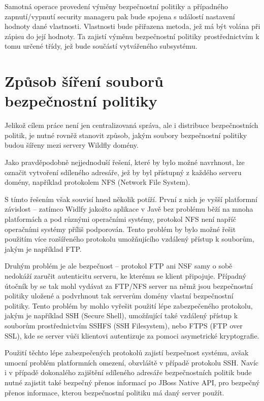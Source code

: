Samotná operace provedení výměny bezpečnostní politiky a případného zapnutí/vypnutí security manageru pak bude spojena s událostí nastavení hodnoty dané vlastnosti. Vlastnosti bude přiřazena metoda, jež má být volána při zápisu do její hodnoty. Ta zajistí výměnu bezpečnostní politiky prostřednictvím k tomu určené třídy, jež bude součástí vytvářeného subsystému.

\section{Způsob šíření souborů bezpečnostní politiky}

Jelikož cílem práce není jen centralizovaná správa, ale i distribuce bezpečnostních politik, je nutné rovněž stanovit způsob, jakým soubory bezpečnostní politiky budou šířeny mezi servery Wildfly domény.

Jako pravděpodobně nejjednoduší řešení, které by bylo možné navrhnout, lze označit vytvoření sdíleného adresáře, jež by byl přístupný z každého serveru domény, například protokolem NFS (Network File System).

S tímto řešením však souvisí hned několik potíží. První z nich je vyšší platformní závislost -- zatímco Widlfy jakožto aplikace v Javě bez problému běží na mnoha platformách a pod různými operačními systémy, protokol NFS není napříč operačními systémy příliš podporován. Tento problém by bylo možné řešit použitím více rozšířeného protokolu umožňujícího vzdálený přístup k souborům, jakým je například FTP.

Druhým problém je ale bezpečnost -- protokol FTP ani NSF samy o sobě nedokáží zaručit autenticitu serveru, ke kterému se klient připojuje. Případný útočník by se tak mohl vydávat za FTP/NFS server na němž jsou bezpečnostní politiky uložené a podvrhnout tak serverům domény vlastní bezpečnostní politiky. Tento problém by mohlo vyřešit použití lépe zabezpečeného protokolu, jakým je například SSH (Secure Shell), umožňující také vzdálený přístup k souborům prostřednictvím SSHFS (SSH Filesystem), nebo FTPS (FTP over SSL), kde se server vůči klientovi autentizuje za pomoci asymetrické kryptografie. \cite[3]{ssh}

Použití těchto lépe zabezpečených protokolů zajistí bezpečnost systému, avšak umocní problém platformních omezení, obzvláště v případě protokolu SSH. Navíc i v případě dokonalého zajištění sdíleného adresáře bezpečnostních politik bude nutné zajistit také bezpečný přenos informací po JBoss Native API, pro bezpečný přenos informace, kterou bezpečnostní politiku má daný server použít.

